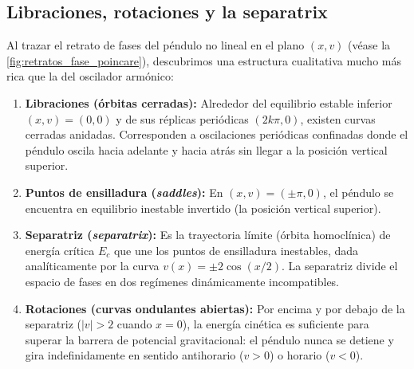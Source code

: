 \subsection{Libraciones, rotaciones y la separatrix}

Al trazar el retrato de fases del péndulo no lineal en el plano $(x, v)$ (véase la \cref{fig:retratos_fase_poincare}), descubrimos una estructura cualitativa mucho más rica que la del oscilador armónico:

\begin{enumerate}
    \item \textbf{Libraciones (órbitas cerradas):} Alrededor del equilibrio estable inferior $(x, v) = (0, 0)$ y de sus réplicas periódicas $(2k\pi, 0)$, existen curvas cerradas anidadas. Corresponden a oscilaciones periódicas confinadas donde el péndulo oscila hacia adelante y hacia atrás sin llegar a la posición vertical superior.
    \item \textbf{Puntos de ensilladura (\emph{saddles}):} En $(x, v) = (\pm \pi, 0)$, el péndulo se encuentra en equilibrio inestable invertido (la posición vertical superior).
    \item \textbf{Separatriz (\emph{separatrix}):} Es la trayectoria límite (órbita homoclínica) de energía crítica $E_c$ que une los puntos de ensilladura inestables, dada analíticamente por la curva $v(x) = \pm 2\cos(x/2)$. La separatriz divide el espacio de fases en dos regímenes dinámicamente incompatibles.
    \item \textbf{Rotaciones (curvas ondulantes abiertas):} Por encima y por debajo de la separatriz ($|v| > 2$ cuando $x=0$), la energía cinética es suficiente para superar la barrera de potencial gravitacional: el péndulo nunca se detiene y gira indefinidamente en sentido antihorario ($v > 0$) o horario ($v < 0$).
\end{enumerate}

